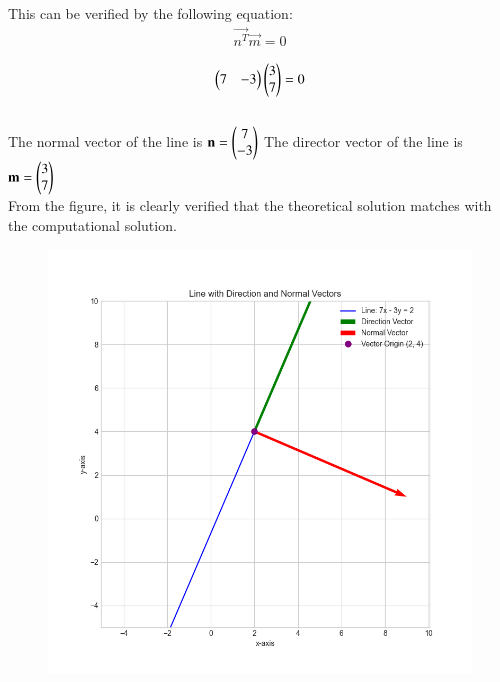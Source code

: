\documentclass[journal]{IEEEtran}
\begin{document}
This can be verified by the following equation:
\begin{align}
\vec{n^T}\vec{m} = 0
\end{align}

\begin{align}
\begin{pmatrix}7 & -3\end{pmatrix}\begin{pmatrix}3 \\ 7\end{pmatrix} = 0
\end{align}\\



The normal vector of the line is $\mathbf{n} = \begin{pmatrix}7 \\ -3\end{pmatrix}$
The director vector of the line is $\mathbf{m} = \begin{pmatrix}3 \\ 7\end{pmatrix}$\\

From the figure, it is clearly verified that the theoretical solution matches with the computational solution.\\
\begin{figure}[h!]
    \centering
    \includegraphics[height=0.5\textheight, keepaspectratio]{figs/Figure_1.png}
    \label{figure_1}
\end{figure}
\end{document}
